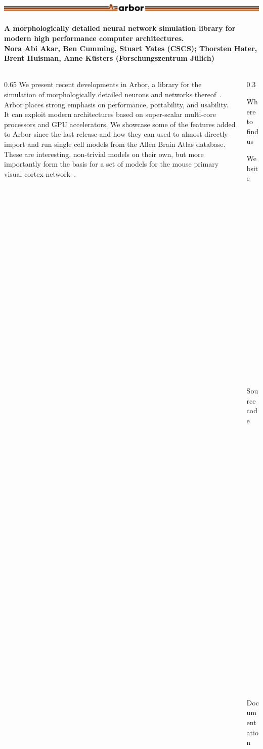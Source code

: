 \documentclass{beamer}
\begin{document}
\begin{frame}[t, fragile]
  \frametitle{\includegraphics[width=0.66\linewidth]{img/arbor-lines-proto-colour-full}}
  \framesubtitle{A morphologically detailed neural network simulation library for modern high performance computer architectures.\\
    \tiny{Nora Abi Akar, Ben Cumming, Stuart Yates (CSCS); Thorsten Hater, Brent Huisman, Anne Küsters (Forschungszentrum Jülich)}}
  \begin{columns}[onlytextwidth,T]
    \begin{column}{0.65\textwidth}
      We present recent developments in Arbor, a library for the simulation of
      morphologically detailed neurons and networks thereof~\cite{arbor}. Arbor
      places strong emphasis on performance, portability, and usability. It can
      exploit modern architectures based on super-scalar multi-core processors
      and GPU accelerators. We showcase some of the features added to Arbor
      since the last release and how they can used to almost directly import and
      run single cell models from the Allen Brain Atlas database. These are
      interesting, non-trivial models on their own, but more importantly form
      the basis for a set of models for the mouse primary visual cortex
      network~\cite{allen-v1}.
    \end{column}
    \begin{column}{0.3\textwidth}
      \vspace*{-1ex}
      \begin{block}{Where to find us}
        \begin{description}
          \item[Website] \href{https://arbor-sim.github.i}{arbor-sim.github.io}
          \item[Source code] \href{https://github.com/arbor-sim/arbor}{github.com/arbor-sim/arbor}
          \item[Documentation] \href{https://arbor.readthedocs.io}{arbor.readthedocs.io}
          \item[Contact] \href{mailto:arbor-sim@fz-juelich.de}{arbor-sim@fz-juelich.de}
        \end{description}
      \end{block}
    \end{column}
  \end{columns}
  \vspace*{-2ex}

\end{frame}
\end{document}
